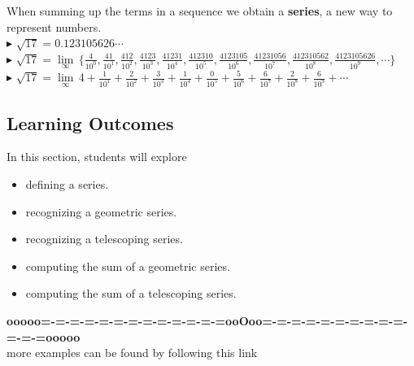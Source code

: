 \documentclass{ximera}
\begin{document}
When summing up the terms in a sequence we obtain a \textbf{series}, a new way to represent numbers. \\


$\blacktriangleright$  $\sqrt{17} = 0.123105626\cdots$ \\



$\blacktriangleright$ $\sqrt{17} =  \lim\limits_{\infty} \, \{ \frac{4}{10^0}, \frac{41}{10^1},  \frac{412}{10^2}, \frac{4123}{10^3}, \frac{41231}{10^4}, \frac{412310}{10^5}, \frac{4123105}{10^6}, \frac{41231056}{10^7}, \frac{412310562}{10^8}, \frac{4123105626}{10^9}, \cdots \}$ \\



$\blacktriangleright$ $\sqrt{17} = \lim\limits_{\infty} \, 4 + \frac{1}{10^1} + \frac{2}{10^2} + \frac{3}{10^3} + \frac{1}{10^4} + \frac{0}{10^5} + \frac{5}{10^6} + \frac{6}{10^7} + \frac{2}{10^8} + \frac{6}{10^9} + \cdots$ \\











\subsection{Learning Outcomes}








\begin{sectionOutcomes}

In this section, students will explore

\begin{itemize}
\item defining a series.
\item recognizing a geometric series.
\item recognizing a telescoping series.
\item computing the sum of a geometric series.
\item computing the sum of a telescoping series.
\end{itemize}

\end{sectionOutcomes}












\begin{center}
\textbf{\textcolor{green!50!black}{ooooo=-=-=-=-=-=-=-=-=-=-=-=-=ooOoo=-=-=-=-=-=-=-=-=-=-=-=-=ooooo}} \\

more examples can be found by following this link\\ 

\end{center}
\end{document}
